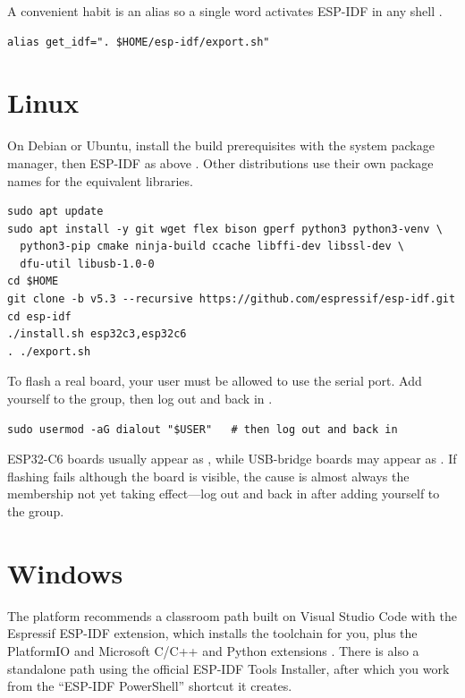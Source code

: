 A convenient habit is an alias so a single word activates ESP-IDF in any shell
\citep{prg32repo}.

\begin{lstlisting}[style=bash,caption={A quality-of-life alias for activating ESP-IDF.}]
alias get_idf=". $HOME/esp-idf/export.sh"
\end{lstlisting}

\section{Linux}

On Debian or Ubuntu, install the build prerequisites with the system package
manager, then ESP-IDF as above \citep{prg32repo}. Other distributions use their own
package names for the equivalent libraries.

\begin{lstlisting}[style=bash,caption={Linux (Debian/Ubuntu) prerequisites, then ESP-IDF.}]
sudo apt update
sudo apt install -y git wget flex bison gperf python3 python3-venv \
  python3-pip cmake ninja-build ccache libffi-dev libssl-dev \
  dfu-util libusb-1.0-0
cd $HOME
git clone -b v5.3 --recursive https://github.com/espressif/esp-idf.git
cd esp-idf
./install.sh esp32c3,esp32c6
. ./export.sh
\end{lstlisting}

To flash a real board, your user must be allowed to use the serial port. Add
yourself to the  group, then log out and back in
\citep{prg32repo}.

\begin{lstlisting}[style=bash,caption={Granting serial-port access on Linux.}]
sudo usermod -aG dialout "$USER"   # then log out and back in
\end{lstlisting}

\begin{prgaside}
ESP32\nobreakdash-C6 boards usually appear as , while USB-bridge boards may
appear as  \citep{prg32repo}. If flashing fails although the
board is visible, the cause is almost always the \code{dialout} membership not yet
taking effect---log out and back in after adding yourself to the group.
\end{prgaside}

\section{Windows}

The platform recommends a classroom path built on Visual Studio Code with the
Espressif ESP-IDF extension, which installs the toolchain for you, plus the
PlatformIO and Microsoft C/C++ and Python extensions \citep{prg32repo}. There is
also a standalone path using the official ESP-IDF Tools Installer, after which you
work from the ``ESP-IDF PowerShell'' shortcut it creates.

